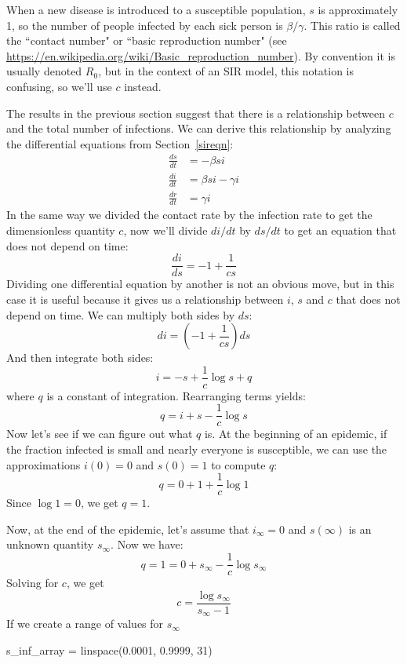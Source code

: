 \documentclass[12pt]{book}
\theoremstyle{exercise}
\begin{document}
When a new disease is introduced to a susceptible population, $s$ is approximately 1, so the number of people infected by each sick person is $\beta / \gamma$.  This ratio is called the ``contact number" or ``basic reproduction number" (see \url{https://en.wikipedia.org/wiki/Basic_reproduction_number}).  By convention it is usually denoted $R_0$, but in the context of an SIR model, this notation is confusing, so we'll use $c$ instead.

The results in the previous section suggest that there is a relationship between $c$ and the total number of infections.  We can derive this relationship by analyzing the differential equations from Section~\ref{sireqn}:
%
\begin{align*}
\frac{ds}{dt} &= -\beta s i \\
\frac{di}{dt} &= \beta s i - \gamma i\\
\frac{dr}{dt} &= \gamma i
\end{align*}
%
In the same way we divided the contact rate by the infection rate to get the dimensionless quantity $c$, now we'll divide $di/dt$ by $ds/dt$ to get an equation that does not depend on time:
%
\[ \frac{di}{ds} = -1 + \frac{1}{cs} \]
%
Dividing one differential equation by another is not an obvious move, but in this case it is useful because it gives us a relationship between $i$, $s$ and $c$ that does not depend on time.  We can multiply both sides by $ds$:
%
\[ di = \left( -1 + \frac{1}{cs} \right) ds \]
%
And then integrate both sides:
%
\[ i = -s + \frac{1}{c} \log s + q \]
%
where $q$ is a constant of integration.  Rearranging terms yields:
%
\[ q = i + s - \frac{1}{c} \log s \]
%
Now let's see if we can figure out what $q$ is.  At the beginning of an epidemic, if the fraction infected is small and nearly everyone is susceptible, we can use the approximations $i(0) = 0$ and $s(0) = 1$ to compute $q$:
%
\[ q = 0 + 1 + \frac{1}{c} \log 1 \]
%
Since $\log 1 = 0$, we get $q = 1$.

\newcommand{\sinf}{s_{\infty}}

Now, at the end of the epidemic, let's assume that $i_{\infty} = 0$ and $s(\infty)$ is an unknown quantity $\sinf$.  Now we have:
%
\[ q = 1 = 0 + \sinf - \frac{1}{c} \log \sinf \]
%
Solving for $c$, we get
%
\[ c = \frac{\log \sinf}{\sinf - 1} \]
%
If we create a range of values for $\sinf$

\begin{python}
s_inf_array = linspace(0.0001, 0.9999, 31)
\end{python}
\end{document}
